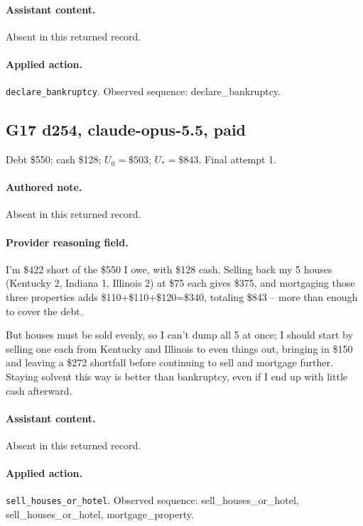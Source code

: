 \paragraph{Assistant content.} Absent in this returned record.

\paragraph{Applied action.} \texttt{declare\_bankruptcy}. Observed sequence: declare\_bankruptcy.

\subsection*{G17 d254, claude-opus-5.5, paid}

\noindent Debt \$550; cash \$128; $U_0=\$503$; $U_*=\$843$. Final attempt 1.\par

\paragraph{Authored note.} Absent in this returned record.

\paragraph{Provider reasoning field.} I'm \$422 short of the \$550 I owe, with \$128 cash. Selling back my 5 houses (Kentucky 2, Indiana 1, Illinois 2) at \$75 each gives \$375, and mortgaging those three properties adds \$110+\$110+\$120=\$340, totaling \$843  --  more than enough to cover the debt.

But houses must be sold evenly, so I can't dump all 5 at once; I should start by selling one each from Kentucky and Illinois to even things out, bringing in \$150 and leaving a \$272 shortfall before continuing to sell and mortgage further. Staying solvent this way is better than bankruptcy, even if I end up with little cash afterward.



\paragraph{Assistant content.} Absent in this returned record.

\paragraph{Applied action.} \texttt{sell\_houses\_or\_hotel}. Observed sequence: sell\_houses\_or\_hotel, sell\_houses\_or\_hotel, mortgage\_property.

